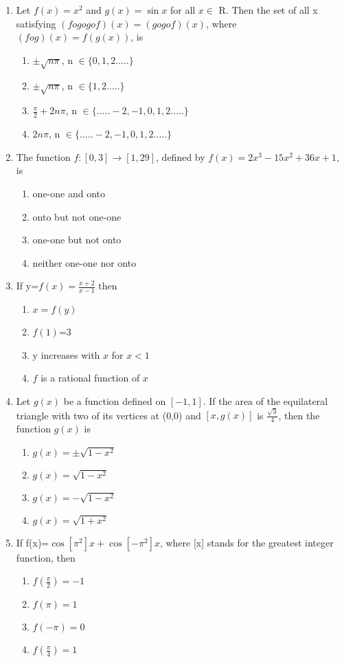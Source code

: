 \begin{enumerate}[label=\arabic*.,ref=\thesubsection.\theenumi]
\item Let $f(x)=x^2$ and $g(x)=\sin x$ for all $x \in$ R. Then the set of all x satisfying $(fogogof)(x)=(gogof)(x)$, where $(fog)(x)=f(g(x))$, is
\begin{enumerate}
\item $\pm \sqrt{n\pi}$, n $\in \{0,1,2.....\}$
\item $\pm \sqrt{n\pi}$, n $\in \{1,2.....\}$
\item $\frac{\pi}{2}+2n\pi$, n $\in \{.....-2,-1,0,1,2.....\}$
\item $2n \pi$, n $\in \{.....-2,-1,0,1,2.....\}$
\end{enumerate}

\item The function $f:[0,3] \rightarrow [1,29]$, defined by $f(x)=2x^{3}-15x^{2}+36x+1$, is
\begin{enumerate}
\item one-one and onto
\item onto but not one-one
\item one-one but not onto
\item neither one-one nor onto
\end{enumerate}

\item If y=$f(x)=\frac{x+2}{x-1}$ then
\begin{enumerate}
\item $x=f(y)$
\item $f(1)$=3
\item y increases with $x$ for $x<1$
\item $f$ is a rational function of $x$
\end{enumerate}

\item Let $g(x)$ be a function defined on $[-1,1]$. If the area of the equilateral triangle with two of its vertices at (0,0) and $[x,g(x)]$ is $\frac{\sqrt{3}}{4}$, then the function $g(x)$ is
\begin{enumerate}
\item $g(x)=\pm\sqrt{1-x^2}$
\item $g(x)=\sqrt{1-x^2}$
\item $g(x)=-\sqrt{1-x^2}$
\item $g(x)=\sqrt{1+x^2}$
\end{enumerate}

\item If f(x)=$\cos [\pi^2]x + \cos [-\pi^2]x$, where [x] stands for the greatest integer function, then
\begin{enumerate}
\item $f(\frac{\pi}{2})=-1$
\item $f(\pi)=1$
\item $f(-\pi)=0$
\item $f(\frac{\pi}{4})=1$
\end{enumerate}


\end{enumerate}

